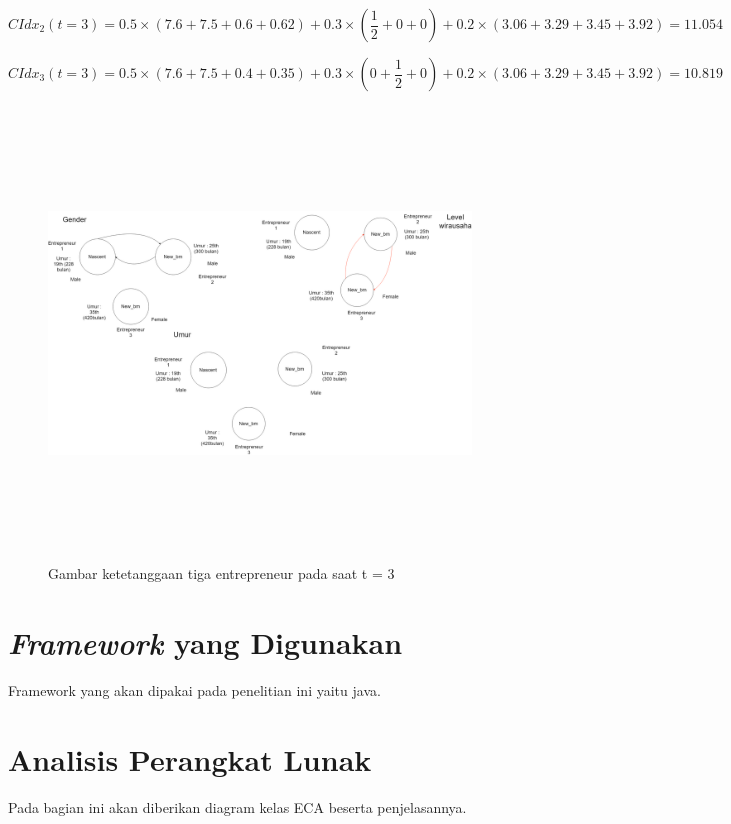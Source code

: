 \begin{equation}
	CIdx_{2}(t=3) = 0.5 \times (7.6 + 7.5 + 0.6 + 0.62) + 0.3 \times (\frac {1} {2} + 0 + 0) + 0.2 \times (3.06 + 3.29 + 3.45 + 3.92) = 11.054
\end{equation}

\begin{equation}
	CIdx_{3}(t=3) = 0.5 \times (7.6 + 7.5 + 0.4 + 0.35) + 0.3 \times (0 + \frac {1} {2} + 0) + 0.2 \times (3.06 + 3.29+ 3.45 + 3.92) = 10.819
\end{equation}

	\begin{figure} [H]
		\centering  
		\includegraphics[width=18cm, height=12cm]{gambarwirausaha(t=3)} 
		\caption[Gambar ketetanggaan tiga entrepreneur pada saat t = 3]{Gambar ketetanggaan tiga entrepreneur pada saat t = 3} 
		\label{fig:t0} 
	\end{figure}


\section{\textit{Framework} yang Digunakan}
\label{framework}
Framework yang akan dipakai pada penelitian ini yaitu java.
	
	
\section{Analisis Perangkat Lunak}
\label{analisisPL}
Pada bagian ini akan diberikan diagram kelas ECA beserta penjelasannya.

